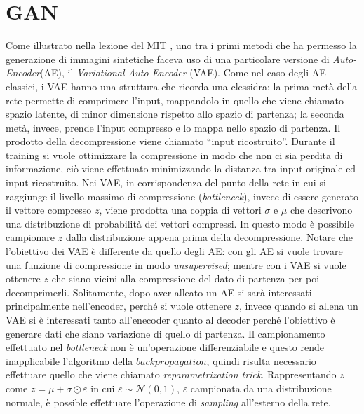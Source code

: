 


\section{GAN}
Come illustrato nella lezione del MIT \cite{MIT_GEN}, uno tra i primi metodi che ha permesso la generazione di immagini sintetiche faceva uso di una particolare versione di \emph{Auto-Encoder}(AE), il \emph{Variational Auto-Encoder} (VAE).
Come nel caso degli AE classici, i VAE hanno una struttura che ricorda una clessidra: la prima metà della rete permette di comprimere l'input, mappandolo in quello che viene chiamato spazio latente, di minor dimensione rispetto allo spazio di partenza;  la seconda metà, invece, prende l'input compresso e lo mappa nello spazio di partenza.
Il prodotto della decompressione viene chiamato ``input ricostruito''.
Durante il training si vuole ottimizzare la compressione in modo che non ci sia perdita di informazione, ciò viene effettuato minimizzando la distanza tra input originale ed input ricostruito.
Nei VAE, in corrispondenza del punto della rete in cui si raggiunge il livello massimo di compressione (\emph{bottleneck}), invece di essere generato il vettore compresso $z$, viene prodotta una coppia di vettori $\sigma$ e $\mu$ che descrivono una distribuzione di probabilità dei vettori compressi.
In questo modo è possibile campionare $z$ dalla distribuzione appena prima della decompressione.
Notare che l'obiettivo dei VAE è differente da quello degli AE: con gli AE si vuole trovare una funzione di compressione in modo \emph{unsupervised}; mentre con i VAE si vuole ottenere $z$ che siano vicini alla compressione del dato di partenza per poi decomprimerli.
Solitamente, dopo aver alleato un AE si sarà interessati principalmente nell'encoder, perché si vuole ottenere $z$, invece quando si allena un VAE si è interessati tanto all'enecoder quanto al decoder perché l'obiettivo è generare dati che siano variazione di quello di partenza.
Il campionamento effettuato nel \emph{bottleneck} non è un'operazione differenziabile e questo rende inapplicabile l'algoritmo della $backpropagation$, quindi risulta necessario effettuare quello che viene chiamato \emph{reparametrization trick}.
Rappresentando $z$ come $z = \mu + \sigma \odot \varepsilon$ in cui $\varepsilon \sim \mathcal{N}(0,1)$, $\varepsilon$ campionata da una distribuzione normale, è possible effettuare l'operazione di \emph{sampling} all'esterno della rete.
